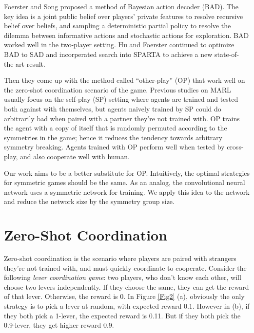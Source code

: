 \documentclass[12pt]{article}
\begin{document}
\begin{spacing}{1.15}
Foerster and Song proposed a method of Bayesian action decoder (BAD)\cite{foerster2018bayesian}. The key idea is a joint public belief over players' private features to resolve recursive belief over beliefs, and sampling a deterministic partial policy to resolve the dilemma between informative actions and stochastic actions for exploration. BAD worked well in the two-player setting. Hu and Foerster continued to optimize BAD to SAD\cite{hu2020simplified} and incorperated search into SPARTA\cite{lerer2020improving} to achieve a new state-of-the-art result.

Then they come up with the method called ``other-play'' (OP) that work well on the zero-shot coordination scenario of the game. Previous studies on MARL usually focus on the self-play (SP) setting where agents are trained and tested both against with themselves, but agents naively trained by SP could do arbitrarily bad when paired with a partner they’re not trained with. OP trains the agent with a copy of itself that is randomly permuted according to the symmetries in the game; hence it reduces the tendency towards arbitrary symmetry breaking. Agents trained with OP perform well when tested by cross-play, and also cooperate well with human.

Our work aims to be a better substitute for OP. Intuitively, the optimal strategies for symmetric games should be the same. As an analog, the convolutional neural network uses a symmetric network for training. We apply this idea to the network and reduce the network size by the symmetry group size.

\section{Zero-Shot Coordination}

Zero-shot coordination is the scenario where players are paired with strangers they're not trained with, and must quickly coordinate to cooperate. Consider the following \textsl{lever coordination game}: two players, who don't know each other, will choose two levers independently. If they choose the same, they can get the reward of that lever. Otherwise, the reward is 0. In Figure \ref{Fig2} (a), obviously the only strategy is to pick a lever at random, with expected reward 0.1. However in (b), if they both pick a 1-lever, the expected reward is 0.11. But if they both pick the 0.9-lever, they get higher reward 0.9.


\end{spacing}
\end{document}
